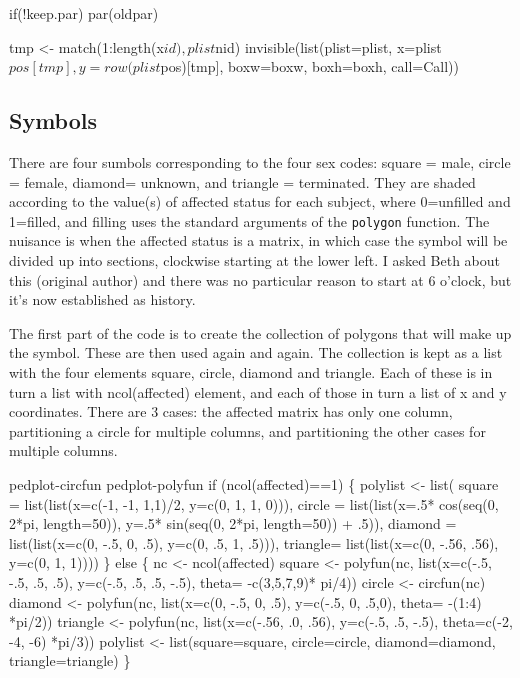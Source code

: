 \documentclass{article}
\begin{document}
if(!keep.par) par(oldpar)

tmp <- match(1:length(x$id), plist$nid)
invisible(list(plist=plist, x=plist$pos[tmp], y= row(plist$pos)[tmp],
               boxw=boxw, boxh=boxh, call=Call))        
\nwendcode{}\nwdocspar
\subsection{Symbols}
There are four sumbols corresponding to the four sex codes: square = male,
circle = female, diamond= unknown, and triangle = terminated.  
They are shaded according to the value(s) of affected status for each
subject, where 0=unfilled and 1=filled, and filling uses the standard
arguments of the {\tt{}polygon} function.
The nuisance is when the affected status is a matrix, in which case the
symbol will be divided up into sections, clockwise starting at the 
lower left. 
I asked Beth about this (original author) and there was no particular
reason to start at 6 o'clock, but it's now established as history.

The first part of the code is to create the collection of polygons that
will make up the symbol.  These are then used again and again.
The collection is kept as a list with the four elements square, circle,
diamond and triangle.  
Each of these is in turn a list with ncol(affected) element, and each
of those in turn a list of x and y coordinates.
There are 3 cases: the affected matrix has
only one column, partitioning a circle for multiple columns, and 
partitioning the other cases for multiple columns.

\nwenddocs{}\endmoddef
\LA{}pedplot-circfun\RA{}
\LA{}pedplot-polyfun\RA{}
if (ncol(affected)==1) \{
    polylist <- list(
        square = list(list(x=c(-1, -1, 1,1)/2,  y=c(0, 1, 1, 0))),
        circle = list(list(x=.5* cos(seq(0, 2*pi, length=50)),
                           y=.5* sin(seq(0, 2*pi, length=50)) + .5)),
        diamond = list(list(x=c(0, -.5, 0, .5), y=c(0, .5, 1, .5))),
        triangle= list(list(x=c(0, -.56, .56),  y=c(0, 1, 1))))
    \}
else \{
    nc <- ncol(affected)
    square <- polyfun(nc, list(x=c(-.5, -.5, .5, .5), y=c(-.5, .5, .5, -.5),
                                theta= -c(3,5,7,9)* pi/4))
    circle <- circfun(nc)
    diamond <-  polyfun(nc, list(x=c(0, -.5, 0, .5), y=c(-.5, 0, .5,0),
                                theta= -(1:4) *pi/2))
    triangle <- polyfun(nc, list(x=c(-.56, .0, .56), y=c(-.5, .5, -.5),
                                 theta=c(-2, -4, -6) *pi/3))
    polylist <- list(square=square, circle=circle, diamond=diamond, 
                     triangle=triangle)
    \}
\nwendcode{}\nwdocspar
\end{document}
